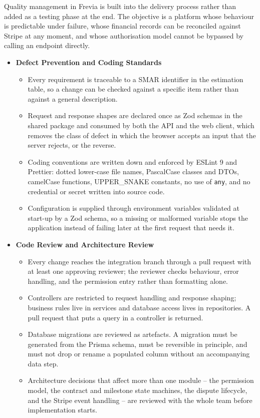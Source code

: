 Quality management in Frevia is built into the delivery process rather than added as a testing phase at the end. The objective is a platform whose behaviour is predictable under failure, whose financial records can be reconciled against Stripe at any moment, and whose authorisation model cannot be bypassed by calling an endpoint directly.

\begin{itemize}
    \item \textbf{Defect Prevention and Coding Standards}
    \begin{itemize}
        \item Every requirement is traceable to a SMAR identifier in the estimation table, so a change can be checked against a specific item rather than against a general description.
        \item Request and response shapes are declared once as Zod schemas in the shared package and consumed by both the API and the web client, which removes the class of defect in which the browser accepts an input that the server rejects, or the reverse.
        \item Coding conventions are written down and enforced by ESLint 9 and Prettier: dotted lower-case file names, PascalCase classes and DTOs, camelCase functions, UPPER\_SNAKE constants, no use of \texttt{any}, and no credential or secret written into source code.
        \item Configuration is supplied through environment variables validated at start-up by a Zod schema, so a missing or malformed variable stops the application instead of failing later at the first request that needs it.
    \end{itemize}

    \item \textbf{Code Review and Architecture Review}
    \begin{itemize}
        \item Every change reaches the integration branch through a pull request with at least one approving reviewer; the reviewer checks behaviour, error handling, and the permission entry rather than formatting alone.
        \item Controllers are restricted to request handling and response shaping; business rules live in services and database access lives in repositories. A pull request that puts a query in a controller is returned.
        \item Database migrations are reviewed as artefacts. A migration must be generated from the Prisma schema, must be reversible in principle, and must not drop or rename a populated column without an accompanying data step.
        \item Architecture decisions that affect more than one module -- the permission model, the contract and milestone state machines, the dispute lifecycle, and the Stripe event handling -- are reviewed with the whole team before implementation starts.
    \end{itemize}


\end{itemize}
